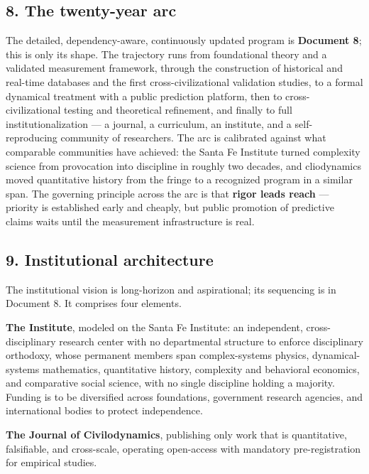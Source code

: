 \documentclass[
]{article}
\begin{document}
\subsection{8. The twenty-year arc}\label{the-twenty-year-arc}

The detailed, dependency-aware, continuously updated program is
\textbf{Document 8}; this is only its shape. The trajectory runs from
foundational theory and a validated measurement framework, through the
construction of historical and real-time databases and the first
cross-civilizational validation studies, to a formal dynamical treatment
with a public prediction platform, then to cross-civilizational testing
and theoretical refinement, and finally to full institutionalization ---
a journal, a curriculum, an institute, and a self-reproducing community
of researchers. The arc is calibrated against what comparable
communities have achieved: the Santa Fe Institute turned complexity
science from provocation into discipline in roughly two decades, and
cliodynamics moved quantitative history from the fringe to a recognized
program in a similar span. The governing principle across the arc is
that \textbf{rigor leads reach} --- priority is established early and
cheaply, but public promotion of predictive claims waits until the
measurement infrastructure is real.

\subsection{9. Institutional
architecture}\label{institutional-architecture}

The institutional vision is long-horizon and aspirational; its
sequencing is in Document 8. It comprises four elements.

\textbf{The Institute}, modeled on the Santa Fe Institute: an
independent, cross-disciplinary research center with no departmental
structure to enforce disciplinary orthodoxy, whose permanent members
span complex-systems physics, dynamical-systems mathematics,
quantitative history, complexity and behavioral economics, and
comparative social science, with no single discipline holding a
majority. Funding is to be diversified across foundations, government
research agencies, and international bodies to protect independence.

\textbf{The Journal of Civilodynamics}, publishing only work that is
quantitative, falsifiable, and cross-scale, operating open-access with
mandatory pre-registration for empirical studies.
\end{document}
